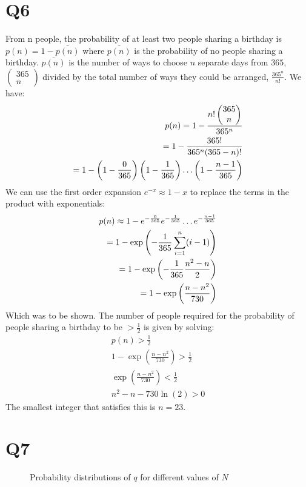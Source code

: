 \documentclass[12pt]{article}
\begin{document}
\section*{Q6}
From n people, the probability of at least two people sharing a birthday is $p(n)=1-\bar{p(n)}$ where $\bar{p(n)}$ is the probability of no people sharing a birthday. $\bar{p(n)}$ is the number of ways to choose $n$ separate days from $365$, $\left(\begin{matrix}365 \\ n\end{matrix}\right)$ divided by the total number of ways they could be arranged, $\frac{365^n}{n!}$. We have:
\begin{align*}
	p(n) = 1-\frac{n!\left(\begin{matrix}365\\n\end{matrix}\right)}{365^n}\\
	= 1-\frac{365!}{365^n(365-n)!}\\
	=1-\left(1-\frac{0}{365}\right)\left(1-\frac{1}{365}\right)\mathellipsis\left(1-\frac{n-1}{365}\right)
\end{align*}
We can use the first order expansion $e^{-x}\approx 1-x$ to replace the terms in the product with exponentials:
\begin{align}
	p(n)\approx 1-e^{-\frac{0}{365}}e^{-\frac{1}{365}}\mathellipsis e^{-\frac{n-1}{365}}\\
	=1-\exp\left(-\frac{1}{365}\sum_{i=1}^n(i-1)\right)\\
	=1-\exp\left(-\frac{1}{365}\frac{n^2-n}{2}\right)\\
	=1-\exp\left(\frac{n-n^2}{730}\right)
\end{align}
Which was to be shown.
The number of people required for the probability of people sharing a birthday to be $>\frac{1}{2}$ is given by solving:
\begin{align}
	p(n) > \frac{1}{2}\\
	1-\exp\left(\frac{n-n^2}{730}\right)>\frac{1}{2}\\
	\exp\left(\frac{n-n^2}{730}\right)<\frac{1}{2}\\
	n^2-n-730\ln(2)>0
\end{align}
The smallest integer that satisfies this is $n=23$.
\section{Q7}
\begin{figure}
\centering
\subfloat{
}\qquad
\caption{Probability distributions of $q$ for different values of $N$}
\end{figure}
\end{document}

